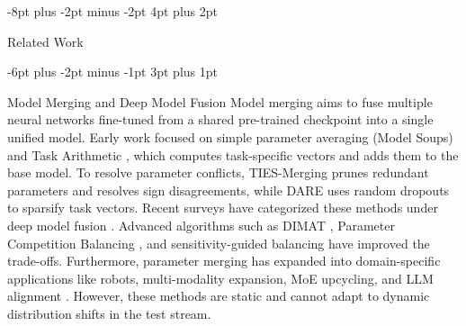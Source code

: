 \documentclass{article}
\makeatletter
\theoremstyle{plain}
\theoremstyle{definition}
\theoremstyle{remark}
\renewcommand{\section}{\@startsection{section}{1}{\z@}%
                       {-8pt plus -2pt minus -2pt}%
                       {4pt plus 2pt}%
                       {\normalfont\large\bfseries\raggedright}}
\renewcommand{\subsection}{\@startsection{subsection}{2}{\z@}%
                          {-6pt plus -2pt minus -1pt}%
                          {3pt plus 1pt}%
                          {\normalfont\normalsize\bfseries\raggedright}}
\makeatother
\begin{document}
\section{Related Work}
\label{sec:related}

\subsection{Model Merging and Deep Model Fusion}
Model merging aims to fuse multiple neural networks fine-tuned from a shared pre-trained checkpoint into a single unified model. Early work focused on simple parameter averaging (Model Soups) \cite{wortsman2022model} and Task Arithmetic \cite{ilharco2022editing}, which computes task-specific vectors and adds them to the base model. To resolve parameter conflicts, TIES-Merging \cite{yadav2023ties} prunes redundant parameters and resolves sign disagreements, while DARE \cite{yu2024dare} uses random dropouts to sparsify task vectors. Recent surveys have categorized these methods under deep model fusion \cite{li2023deep,tang2024fusionbench}. Advanced algorithms such as DIMAT \cite{saadati2024dimat}, Parameter Competition Balancing \cite{du2024parameter}, and sensitivity-guided balancing \cite{liu2025sens-merging} have improved the trade-offs. Furthermore, parameter merging has expanded into domain-specific applications like robots, multi-modality expansion, MoE upcycling, and LLM alignment \cite{jang2023personalized,yadav2025robust,li2025multi-modality,hui2024upcycling,ju2024mitigating,zeng2025robustmerge,zeng2025parameter,qiu2026parameter}. However, these methods are static and cannot adapt to dynamic distribution shifts in the test stream.
\end{document}
